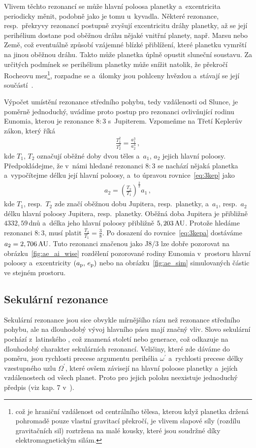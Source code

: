 \documentclass[A4paper, 12pt, oneside]{book}
\begin{document}
Vlivem těchto rezonancí se může hlavní poloosa planetky a~excentricita periodicky měnit, podobně jako je tomu u~kyvadla. Některé rezonance, resp.\ překryvy rezonancí postupně zvyšují excentricitu dráhy planetky, až se její perihélium dostane pod oběžnou dráhu nějaké vnitřní planety, např. Marsu nebo Země, což eventuálně způsobí vzájemné blízké přiblížení, které planetku vymrští na jinou oběžnou dráhu. Takto může planetka úplně opustit sluneční soustavu. Za určitých podmínek se perihélium planetky může snížit natolik, že překročí Rocheovu mez\footnote{což je hraniční vzdálenost od centrálního tělesa, kterou když planetka držená pohromadě pouze vlastní gravitací překročí, je vlivem slapové síly (rozdílu gravitačních sil) roztržena na malé kousky, které jsou soudržné díky elektromagnetickým silám.}, rozpadne se a~úlomky jsou pohlceny hvězdou a~stávají se její součástí~\cite{pichierri17}.

Výpočet umístění rezonance středního pohybu, tedy vzdálenosti od Slunce, je poměrně jednoduchý, uvádíme proto postup pro rezonanci ovlivňující rodinu Eunomia, kterou je rezonance $8:3$ s~Jupiterem. Vzpomeňme na Třetí Keplerův zákon, který říká
\begin{align} \label{eq:3kep}
	\frac{T_1^2}{T_2^2}=\frac{a_1^3}{a_2^3}\,, 
\end{align}
kde $T_1$, $T_2$ označují oběžné doby dvou těles a~$a_1$, $a_2$ jejich hlavní poloosy. Předpokládejme, že v~námi hledané rezonanci $8:3$ se nachází nějaká planetka a~vypočítejme délku její hlavní poloosy, a~to úpravou rovnice~\eqref{eq:3kep} jako
\begin{align} \label{eq:3kepa}
	a_2=\left(\frac{T_2}{T_1}\right)^{\frac{2}{3}}a_1\,,
\end{align}
kde $T_1$, resp.\ $T_2$ zde značí oběžnou dobu Jupitera, resp.\ planetky, a~$a_1$, resp.\ $a_2$ délku hlavní poloosy Jupitera, resp.\ planetky. Oběžná doba Jupitera je přibližně $4332,59\,$dnů a~délka jeho hlavní poloosy přibližně $5,203\,{\rm AU}$. Protože hledáme rezonanci $8:3$, musí platit $\frac{T_2}{T_1}=\frac{3}{8}$. Po dosazení do rovnice~\eqref{eq:3kepa} dostáváme $a_2=2,706\,{\rm AU}$. Tuto rezonanci značenou jako J8/3 lze dobře pozorovat na obrázku~\ref{fig:ae_ai_wise} rozdělení pozorované rodiny Eunomia v~prostoru hlavní poloosy a~excentricity $(a_{\rm p},\,e_{\rm p})$ nebo na obrázku~\ref{fig:ae_sim} simulovaných částic ve stejném prostoru.
\subsection{Sekulární rezonance} 
Sekulární rezonance jsou sice obvykle mírnějšího rázu než rezonance středního pohybu, ale na dlouhodobý vývoj hlavního pásu mají značný vliv. Slovo sekulární pochází z~latinského , což znamená století nebo generace, což odkazuje na dlouhodobý charakter sekulárních rezonancí. Veličiny, které zde dáváme do poměru, jsou rychlosti precese argumentu perihélia $\omega^\prime$ a~rychlosti precese délky vzestupného uzlu $\Omega^\prime$, které ovšem závisejí na hlavní poloose planetky a~jejích vzdálenostech od všech planet. Proto pro jejich polohu neexistuje jednoduchý předpis (viz kap. 7 v~\cite{murray00}).
\end{document}
